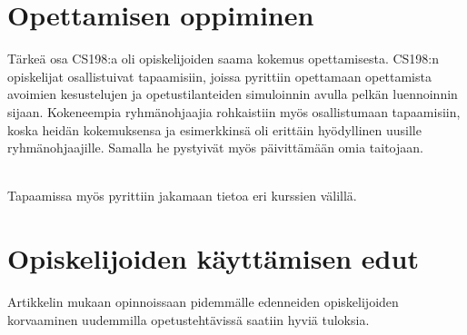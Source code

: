 \documentclass[finnish]{tktltiki2}
\theoremstyle{definition}
\theoremstyle{remark}
\begin{document}
\section{Opettamisen oppiminen}

Tärkeä osa CS198:a oli opiskelijoiden saama kokemus opettamisesta. CS198:n opiskelijat osallistuivat tapaamisiin, joissa pyrittiin opettamaan opettamista avoimien kesustelujen ja opetustilanteiden simuloinnin avulla pelkän luennoinnin sijaan. Kokeneempia ryhmänohjaajia rohkaistiin myös osallistumaan tapaamisiin, koska heidän kokemuksensa ja esimerkkinsä oli erittäin hyödyllinen uusille ryhmänohjaajille. Samalla he pystyivät myös päivittämään omia taitojaan. 

\\

Tapaamissa myös pyrittiin jakamaan tietoa eri kurssien välillä.


\section{Opiskelijoiden käyttämisen edut}

Artikkelin mukaan opinnoissaan pidemmälle edenneiden opiskelijoiden korvaaminen uudemmilla opetustehtävissä saatiin hyviä tuloksia.  





\end{document}
